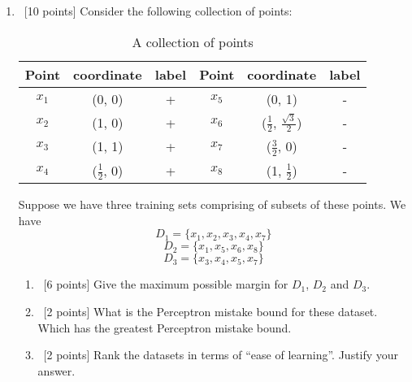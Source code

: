 \begin{enumerate}
\item ~[10 points]  Consider the following collection of points:
  \begin{table}[H]
    \centering
    \begin{tabular}{| c | c | c  ||  c | c | c |}
      \hline
      Point & coordinate  & label & Point & coordinate  & label \\
      \hline
      $x_1$ & (0, 0)             & + & $x_5$ & (0, 1)                                & - \\
      $x_2$ & (1, 0)             & + & $x_6$ & ($\frac{1}{2}$, $\frac{\sqrt{3}}{2}$) & - \\
      $x_3$ & (1, 1)             & + & $x_7$ & ($\frac{3}{2}$, 0)                    & - \\
      $x_4$ & ($\frac{1}{2}$, 0) & + & $x_8$ & (1, $\frac{1}{2}$)                    & - \\
      \hline
    \end{tabular}
    \caption{A collection of points}
  \end{table}

  Suppose we have three training sets comprising of subsets of these
  points. We have
  $$D_1 = \{x_1, x_2, x_3, x_4, x_7\}$$
  $$D_2 = \{x_1, x_5, x_6, x_8\}$$
  $$D_3 = \{x_3, x_4, x_5, x_ 7\}$$

  \begin{enumerate}
  \item ~[6 points] Give the maximum possible margin for $D_1$, $D_2$
    and $D_3$.
  \item ~[2 points] What is the Perceptron mistake bound for these
    dataset. Which has the greatest Perceptron mistake bound.
  \item ~[2 points] Rank the datasets in terms of ``ease of
    learning''. Justify your answer.
  \end{enumerate}

\end{enumerate}


